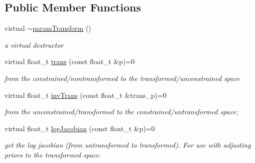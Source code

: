 \subsection*{Public Member Functions}
\begin{DoxyCompactItemize}
\item 
\mbox{\label{classparamTransform_a087c9c2780ede665f3e980415231cb70}} 
virtual \hyperlink{classparamTransform_a087c9c2780ede665f3e980415231cb70}{$\sim$param\+Transform} ()
\begin{DoxyCompactList}\small\item\em a virtual destructor \end{DoxyCompactList}\item 
\mbox{\label{classparamTransform_a1213b2492d665acb1a74d53effde7dc3}} 
virtual float\+\_\+t \hyperlink{classparamTransform_a1213b2492d665acb1a74d53effde7dc3}{trans} (const float\+\_\+t \&p)=0
\begin{DoxyCompactList}\small\item\em from the constrained/nontransformed to the transformed/unconstrained space \end{DoxyCompactList}\item 
\mbox{\label{classparamTransform_a4c1b144a907dca81a3a68c1f020fe208}} 
virtual float\+\_\+t \hyperlink{classparamTransform_a4c1b144a907dca81a3a68c1f020fe208}{inv\+Trans} (const float\+\_\+t \&trans\+\_\+p)=0
\begin{DoxyCompactList}\small\item\em from the unconstrained/transformed to the constrained/untransformed space; \end{DoxyCompactList}\item 
\mbox{\label{classparamTransform_a15e0177686604b18c5d906f0fee4081e}} 
virtual float\+\_\+t \hyperlink{classparamTransform_a15e0177686604b18c5d906f0fee4081e}{log\+Jacobian} (const float\+\_\+t \&p)=0
\begin{DoxyCompactList}\small\item\em get the log jacobian (from untransformed to transformed). For use with adjusting priors to the transformed space. \end{DoxyCompactList}\end{DoxyCompactItemize}
